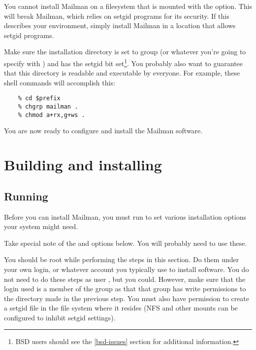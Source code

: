 \documentclass{howto}
\begin{document}
\begin{notice}[warning]
You cannot install Mailman on a filesystem that is mounted with the
 option.  This will break Mailman, which relies on setgid
programs for its security.  If this describes your environment, simply install
Mailman in a location that allows setgid programs.
\end{notice}

Make sure the installation directory is set to group  (or
whatever you're going to specify with ) and has
the setgid bit set\footnote{BSD users should see the \ref{bsd-issues} section
for additional information.}.  You probably also want to guarantee that this
directory is readable and executable by everyone.  For example, these shell
commands will accomplish this:

\begin{verbatim}
    % cd $prefix
    % chgrp mailman .
    % chmod a+rx,g+ws .
\end{verbatim}

You are now ready to configure and install the Mailman software.

\section{Building and installing\label{building}}

\subsection{Running }

Before you can install Mailman, you must run  to set
various installation options your system might need.

\begin{notice}[note]
Take special note of the  and
 options below.  You will probably need to use
these.
\end{notice}

You should  be root while performing the steps in this section.
Do them under your own login, or whatever account you typically use to install
software.  You do not need to do these steps as user , but you
could.  However, make sure that the login used is a member of the
 group as that that group has write permissions to the
 directory made in the previous step.  You must also have
permission to create a setgid file in the file system where it resides (NFS
and other mounts can be configured to inhibit setgid settings).
\end{document}
